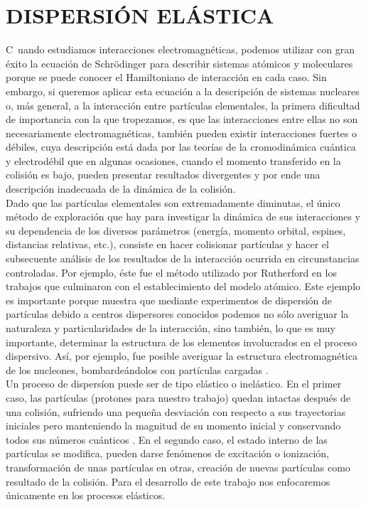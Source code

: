 \chapter{DISPERSI\'ON EL\'ASTICA}\label{dispersionelastica}
\lettrine[lines=3, loversize=-0.1, lraise=0.1]C\ uando estudiamos interacciones electromagn\'eticas, podemos utilizar con gran \'exito la ecuaci\'on de Schr\"odinger para describir sistemas at\'omicos y moleculares porque se puede conocer el Hamiltoniano de interacci\'on en cada caso. Sin embargo, si queremos aplicar esta ecuaci\'on a la descripci\'on de sistemas nucleares o, m\'as general,   a la interacci\'on entre  part\'iculas elementales, la primera dificultad de importancia con la que tropezamos, es que las interacciones entre ellas no son necesariamente electromagn\'eticas, tambi\'en pueden existir interacciones fuertes o d\'ebiles, cuya descripci\'on est\'a dada por las teor\'ias de la cromodin\'amica cu\'antica y electrod\'ebil que en algunas ocasiones, cuando el momento transferido en la colisi\'on es bajo, pueden presentar resultados divergentes y por ende una descripci\'on inadecuada de la din\'amica de la colisi\'on.\\ 

\sp Dado que las part\'iculas elementales son extremadamente diminutas, el \'unico m\'etodo de exploraci\'on que hay para investigar la din\'amica de sus interacciones y su dependencia de
los diversos par\'ametros (energ\'ia, momento orbital,
espines, distancias relativas, etc.), consiste en hacer colisionar part\'iculas y hacer el
subsecuente an\'alisis de los resultados de la interacci\'on ocurrida en circunstancias
controladas.  Por ejemplo, \'este fue el m\'etodo utilizado por Rutherford en los trabajos que culminaron con el establecimiento del modelo at\'omico. Este
ejemplo es importante porque muestra que mediante experimentos de dispersi\'on
de part\'iculas debido a centros dispersores conocidos podemos no s\'olo averiguar la naturaleza y particularidades de la interacci\'on, sino tambi\'en, lo que es muy importante, determinar la estructura de los elementos involucrados en el proceso dispersivo. As\'i, por
ejemplo, fue posible averiguar la estructura electromagn\'etica de los nucleones,
bombarde\'andolos con part\'iculas cargadas \cite{luisdelapeya}. \\

\sp Un proceso de dispers\'ion puede ser de tipo el\'astico o inel\'astico. En el primer caso, las part\'iculas (protones para nuestro trabajo) quedan intactas despu\'es de una colisi\'on, sufriendo una peque\~na desviaci\'on con respecto a sus trayectorias iniciales pero  manteniendo la magnitud de su momento inicial y conservando todos sus n\'umeros cu\'anticos \cite{carlosavila}. En el segundo caso, el estado interno de las part\'iculas se modifica, pueden darse fen\'omenos de excitaci\'on o ionizaci\'on, transformaci\'on
de unas part\'iculas en otras, creaci\'on de nuevas part\'iculas como resultado de la
colisi\'on. Para el desarrollo de este trabajo nos enfocaremos \'unicamente en los procesos el\'asticos.
